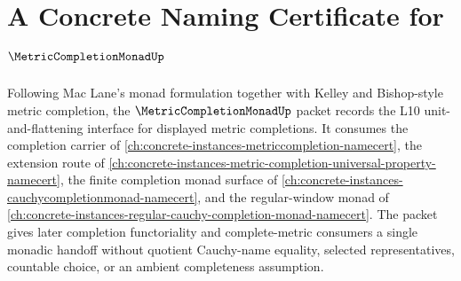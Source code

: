 \chapter{A Concrete Naming Certificate for $\MetricCompletionMonadUp$}
\label{ch:concrete-instances-metric-completion-monad-namecert}

Following Mac Lane's monad formulation together with Kelley and Bishop-style metric completion, the $\MetricCompletionMonadUp$ packet records the L10 unit-and-flattening interface for displayed metric completions. It consumes the completion carrier of \autoref{ch:concrete-instances-metriccompletion-namecert}, the extension route of \autoref{ch:concrete-instances-metric-completion-universal-property-namecert}, the finite completion monad surface of \autoref{ch:concrete-instances-cauchycompletionmonad-namecert}, and the regular-window monad of \autoref{ch:concrete-instances-regular-cauchy-completion-monad-namecert}. The packet gives later completion functoriality and complete-metric consumers a single monadic handoff without quotient Cauchy-name equality, selected representatives, countable choice, or an ambient completeness assumption.

